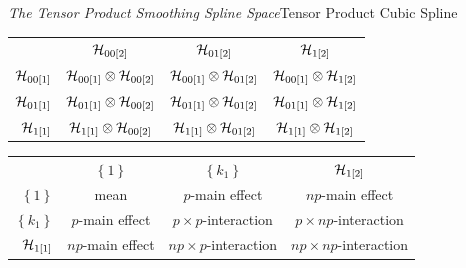 \begin{frame}{\emph{The Tensor Product Smoothing Spline Space}}{Tensor Product Cubic Spline}

\footnotesize
\begin{center}
\label{table:tensor-product-cubic-spline-RKHS-table}
\begin{tabular}{r|c|c|c|} %
\multicolumn{1}{c}{} & \multicolumn{1}{c}{	$\mathcal{H}_{00\left[2\right]}$}	&	\multicolumn{1}{c}{$\mathcal{H}_{01\left[2\right]} $}	&\multicolumn{1}{c}{ $\mathcal{H}_{1\left[2\right]}$}\\ [1.5ex] 
\cline{2-4}  %
$\mathcal{H}_{00\left[1\right]} $		& $\mathcal{H}_{00\left[1\right]}\otimes \mathcal{H}_{00\left[2\right]}$ 	&	$\mathcal{H}_{00\left[1\right]}	\otimes \mathcal{H}_{01\left[2\right]} $	&	$\mathcal{H}_{00\left[1\right]}	\otimes \mathcal{H}_{1\left[2\right]}$   \\ [1.5ex] 
$\mathcal{H}_{01\left[1\right]}$		& $\mathcal{H}_{01\left[1\right]} \otimes \mathcal{H}_{00\left[2\right]}$			& 	$\mathcal{H}_{01\left[1\right]} \otimes \mathcal{H}_{01\left[2\right]}$   &   $\mathcal{H}_{01\left[1\right]} \otimes \mathcal{H}_{1\left[2\right]}$\\ [1.5ex] 
 $\mathcal{H}_{1\left[1\right]}$	& 	 $\mathcal{H}_{1\left[1\right]} \otimes \mathcal{H}_{00\left[2\right]}$	&	$\mathcal{H}_{1\left[1\right]} \otimes \mathcal{H}_{01\left[2\right]}$ 	&	$\mathcal{H}_{1\left[1\right]} \otimes \mathcal{H}_{1\left[2\right]}$ \\ [1.5ex] 
\cline{2-4}
\end{tabular}

\vspace{1cm}

\begin{tabular}{r|c|c|c|} %
\multicolumn{1}{c}{} & \multicolumn{1}{c}{	$\left\{1\right\}$}	&	\multicolumn{1}{c}{$ \left\{k_1\right\}$}	&\multicolumn{1}{c}{ $\mathcal{H}_{1\left[2\right]}$}\\ [1.5ex] 
\cline{2-4}  %
$ \left\{1\right\}$		& mean	&	$p$-main effect	&	$np$-main effect  \\ [1.5ex] 
$ \left\{k_1\right\}$	& 	$p$-main effect	& 	$p\times p$-interaction   & $p \times np$-interaction  \\ [1.5ex] 
 $\mathcal{H}_{1\left[1\right]}$	& 	$np$-main effect 	&  $np\times p$-interaction	&	$np \times np$-interaction \\ [1.5ex] 
\cline{2-4}
\end{tabular}
\end{center}

\end{frame}



